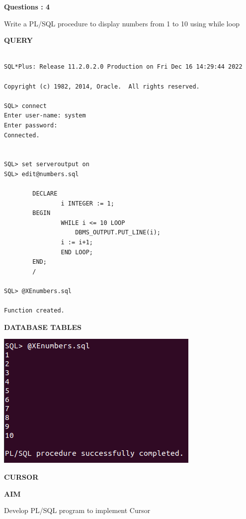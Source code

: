 \documentclass[a4paper,12pt]{report}
\begin{document}
\begin{flushleft}
    \textbf{Questions : 4}
\end{flushleft}
Write a PL/SQL procedure to display numbers from 1 to 10 using while loop
\begin{flushleft}
		\textbf{QUERY }
	\end{flushleft}
 \begin{verbatim}
 
SQL*Plus: Release 11.2.0.2.0 Production on Fri Dec 16 14:29:44 2022

Copyright (c) 1982, 2014, Oracle.  All rights reserved.

SQL> connect
Enter user-name: system
Enter password:
Connected.


SQL> set serveroutput on
SQL> edit@numbers.sql

		DECLARE
    			i INTEGER := 1;
		BEGIN
    			WHILE i <= 10 LOOP 
        			DBMS_OUTPUT.PUT_LINE(i);
    			i := i+1;
    			END LOOP;
		END;
		/

SQL> @XEnumbers.sql

Function created.

\end{verbatim}
\begin{flushleft}
		\textbf{DATABASE TABLES} 
\end{flushleft} 

\includegraphics[scale=0.7]{NUMBERS.png}

\newpage
\begin{center}
\large\textbf{CURSOR}
\end{center}

\begin{flushleft}
\textbf{AIM }
\end{flushleft}
Develop PL/SQL program to implement Cursor
\end{document}
